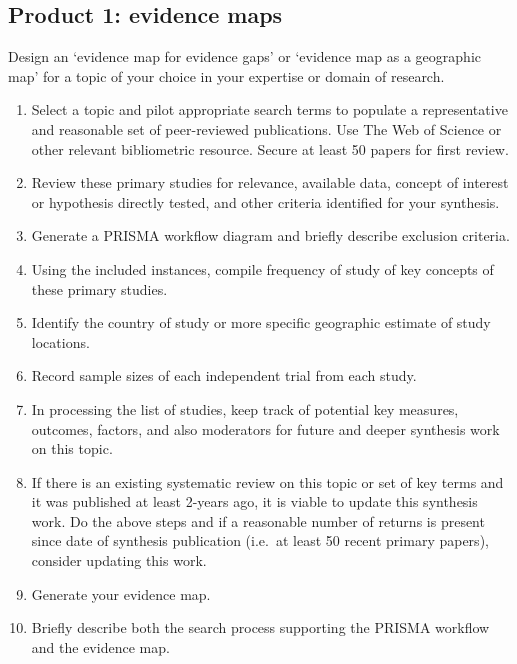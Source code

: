 \documentclass[
]{book}
\providecommand{\tightlist}{%
  \setlength{\itemsep}{0pt}\setlength{\parskip}{0pt}}
\begin{document}
\hypertarget{product-1-evidence-maps}{%
\subsection*{Product 1: evidence maps}\label{product-1-evidence-maps}}

Design an `evidence map for evidence gaps' or `evidence map as a geographic map' for a topic of your choice in your expertise or domain of research.

\begin{enumerate}
\def\labelenumi{\arabic{enumi}.}
\tightlist
\item
  Select a topic and pilot appropriate search terms to populate a representative and reasonable set of peer-reviewed publications. Use The Web of Science or other relevant bibliometric resource. Secure at least 50 papers for first review.\\
\item
  Review these primary studies for relevance, available data, concept of interest or hypothesis directly tested, and other criteria identified for your synthesis.\\
\item
  Generate a PRISMA workflow diagram and briefly describe exclusion criteria.\\
\item
  Using the included instances, compile frequency of study of key concepts of these primary studies.\\
\item
  Identify the country of study or more specific geographic estimate of study locations.\\
\item
  Record sample sizes of each independent trial from each study.\\
\item
  In processing the list of studies, keep track of potential key measures, outcomes, factors, and also moderators for future and deeper synthesis work on this topic.\\
\item
  If there is an existing systematic review on this topic or set of key terms and it was published at least 2-years ago, it is viable to update this synthesis work. Do the above steps and if a reasonable number of returns is present since date of synthesis publication (i.e.~at least 50 recent primary papers), consider updating this work.\\
\item
  Generate your evidence map.\\
\item
  Briefly describe both the search process supporting the PRISMA workflow and the evidence map.
\end{enumerate}
\end{document}
